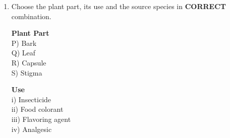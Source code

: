 \documentclass[journal]{IEEEtran}
\begin{document}
\begin{enumerate}
\begin{center}
\begin{multicols}{3}
\noindent \textbf{Pathogen} \\
P) \textit{Blumeria graminis} \\
Q) \textit{Magnaporthe grisea} \\
R) \textit{Venturia inaequalis} \\
S) \textit{Cercospora personata} \\

\columnbreak

\noindent \textbf{Disease} \\
i) Blast disease \\
ii) Powdery mildew \\
iii) Tikka disease \\
iv) Scab disease \\

\columnbreak

\noindent \textbf{Plant} \\
1) Groundnut \\
2) Apple \\
3) Barley \\
4) Rice \\
\end{multicols}

\end{center}

\begin{enumerate}
    \item P-i-1, Q-ii-2, R-iii-3, S-iv-4
    \item P-i-2, Q-ii-1, R-iii-4, S-iv-3
    \item P-i-3, Q-i-4, R-ii-2, S-iii-1
    \item P-ii-3, Q-i-4, R-iii-2, S-iv-1
\end{enumerate}


\clearpage
\item Choose the plant part, its use and the source species in \textbf{CORRECT} combination. \hfill {}

\begin{multicols}{3}
\noindent \textbf{Plant Part} \\
P) Bark \\
Q) Leaf \\
R) Capsule \\
S) Stigma \\

\columnbreak

\noindent \textbf{Use} \\
i) Insecticide \\
ii) Food colorant \\
iii) Flavoring agent \\
iv) Analgesic \\


\end{multicols}
\end{enumerate}
\end{document}
